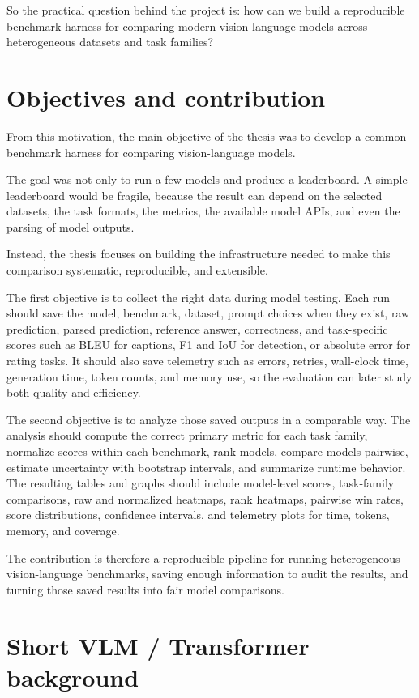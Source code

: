 \documentclass[11pt,a4paper]{article}
\begin{document}
So the practical question behind the project is: how can we build a reproducible benchmark harness for comparing modern vision-language models across heterogeneous datasets and task families?

\section{Objectives and contribution}

From this motivation, the main objective of the thesis was to develop a common benchmark harness for comparing vision-language models.

The goal was not only to run a few models and produce a leaderboard. A simple leaderboard would be fragile, because the result can depend on the selected datasets, the task formats, the metrics, the available model APIs, and even the parsing of model outputs.

Instead, the thesis focuses on building the infrastructure needed to make this comparison systematic, reproducible, and extensible.

The first objective is to collect the right data during model testing. Each run should save the model, benchmark, dataset, prompt choices when they exist, raw prediction, parsed prediction, reference answer, correctness, and task-specific scores such as BLEU for captions, F1 and IoU for detection, or absolute error for rating tasks. It should also save telemetry such as errors, retries, wall-clock time, generation time, token counts, and memory use, so the evaluation can later study both quality and efficiency.

The second objective is to analyze those saved outputs in a comparable way. The analysis should compute the correct primary metric for each task family, normalize scores within each benchmark, rank models, compare models pairwise, estimate uncertainty with bootstrap intervals, and summarize runtime behavior. The resulting tables and graphs should include model-level scores, task-family comparisons, raw and normalized heatmaps, rank heatmaps, pairwise win rates, score distributions, confidence intervals, and telemetry plots for time, tokens, memory, and coverage.

The contribution is therefore a reproducible pipeline for running heterogeneous vision-language benchmarks, saving enough information to audit the results, and turning those saved results into fair model comparisons.

\section{Short VLM / Transformer background}
\end{document}
